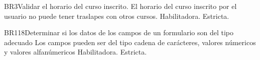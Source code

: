 \begin{BussinesRule}{BR3}{Validar el horario del curso inscrito.}
	\BRitem[Descripción:] El horario del curso inscrito por el usuario no puede tener traslapes con otros cursos.
	\BRitem[Tipo:] Habilitadora.
	\BRitem[Nivel:] Estricta.
\end{BussinesRule}

\begin{BussinesRule}{BR118}{Determinar si los datos de los campos de un formulario son del tipo adecuado} 
	\BRitem[Descripción:] Los campos pueden ser del tipo cadena de carácteres, valores númericos y valores alfanúmericos
	\BRitem[Tipo:] Habilitadora.
	\BRitem[Nivel:] Estricta.
\end{BussinesRule}


